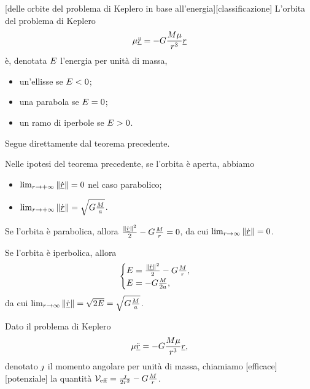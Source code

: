 \begin{Corollary}
	[delle orbite del problema di Keplero in base all'energia][classificazione]
	L'orbita del problema di Keplero
	\[
		\mu \ddot{\underline{r}} = - G \frac{M\mu}{r^3}\underline{r}
	\]
	\`e, denotata $E$ l'energia per unit\`a di massa,
	\begin{itemize}
		\item un'ellisse se $E < 0$;
		\item una parabola se $E = 0$;
		\item un ramo di iperbole se $E > 0$.
	\end{itemize}
\end{Corollary}
\Proof Segue direttamente dal teorema precedente. \EndProof
\begin{Corollary}
	Nelle ipotesi del teorema precedente, se l'orbita \`e aperta, abbiamo
	\begin{itemize}
		\item $\lim_{r \rightarrow + \infty} \Norm{\dot{\vec{r}}} = 0$ nel caso parabolico;
		\item $\lim_{r \rightarrow + \infty} \Norm{\dot{\vec{r}}} = \sqrt{\NewtonConstant \frac{\TotalMass}{\SemiMajorAxis}}$.
	\end{itemize}
\end{Corollary}
\Proof Se l'orbita \`e parabolica, allora $\frac{\Norm{\dot{\vec{r}}}^2}{2} - \NewtonConstant \frac{\TotalMass}{r} = 0$, da cui $\lim_{r \rightarrow \infty} \Norm{\dot{\vec{r}}} = 0$.
\par Se l'orbita \`e iperbolica, allora
\[
\begin{cases}
	\EnergyPerUnitMass = \frac{\Norm{\dot{\vec{r}}}^2}{2} - \NewtonConstant \frac{\TotalMass}{r},\\
	\EnergyPerUnitMass = - \NewtonConstant \frac{\TotalMass}{2\SemiMajorAxis},
\end{cases}
\]
da cui $\lim_{r \rightarrow \infty} \Norm{\dot{\vec{r}}} = \sqrt{2\EnergyPerUnitMass} = \sqrt{\NewtonConstant\frac{\TotalMass}{\SemiMajorAxis}}$. \EndProof
\begin{Definition}
	Dato il problema di Keplero
	\[
		\mu \ddot{\underline{r}} = - G \frac{M\mu}{r^3}\underline{r},
	\]
	denotato $\jmath$ il momento angolare per unit\`a di massa, chiamiamo [efficace][potenziale] la quantit\`a $\mathcal{V}_{\text{eff}} = \frac{\jmath}{2r^2} - G\frac{M}{r}$.
\end{Definition}
